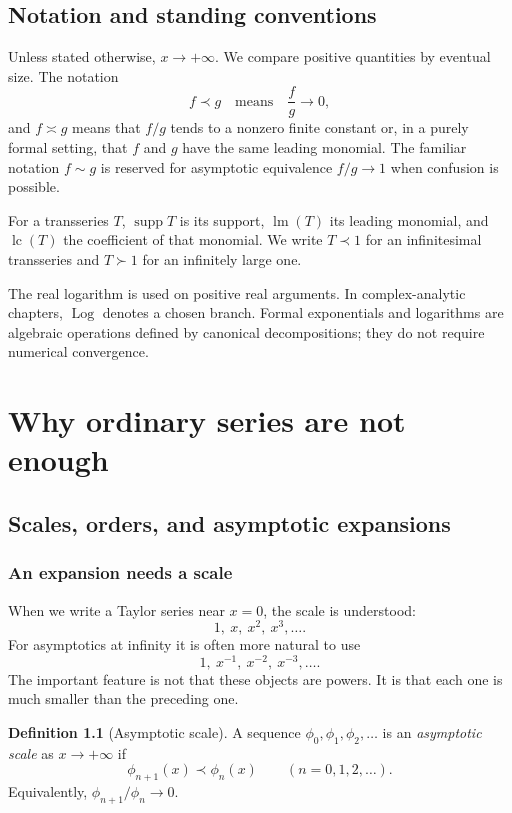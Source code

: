 \documentclass[11pt,openany]{book}
\theoremstyle{definition}
\newtheorem{definition}{Definition}[chapter]
\theoremstyle{plain}
\theoremstyle{remark}
\newcommand{\asym}{\sim}
\newcommand{\precdom}{\prec}
\newcommand{\succdom}{\succ}
\newcommand{\equivdom}{\asymp}
\DeclareMathOperator{\supp}{supp}
\DeclareMathOperator{\lm}{lm}
\DeclareMathOperator{\lc}{lc}
\DeclareMathOperator{\Log}{Log}
\begin{document}
\chapter*{Notation and standing conventions}

Unless stated otherwise, $x\to+\infty$. We compare positive quantities by eventual size. The notation
\[
 f\precdom g
 \quad\text{means}\quad
 \frac{f}{g}\longrightarrow 0,
\]
and $f\equivdom g$ means that $f/g$ tends to a nonzero finite constant or, in a purely formal setting, that $f$ and $g$ have the same leading monomial. The familiar notation $f\asym g$ is reserved for asymptotic equivalence $f/g\to1$ when confusion is possible.

For a transseries $T$, $\supp T$ is its support, $\lm(T)$ its leading monomial, and $\lc(T)$ the coefficient of that monomial. We write $T\precdom1$ for an infinitesimal transseries and $T\succdom1$ for an infinitely large one.

The real logarithm is used on positive real arguments. In complex-analytic chapters, $\Log$ denotes a chosen branch. Formal exponentials and logarithms are algebraic operations defined by canonical decompositions; they do not require numerical convergence.

\tableofcontents

\mainmatter

\part{Why ordinary series are not enough}

\chapter{Scales, orders, and asymptotic expansions}\label{ch:scales}

\section{An expansion needs a scale}

When we write a Taylor series near $x=0$, the scale is understood:
\[
 1,\ x,\ x^2,\ x^3,\ldots.
\]
For asymptotics at infinity it is often more natural to use
\[
 1,\ x^{-1},\ x^{-2},\ x^{-3},\ldots.
\]
The important feature is not that these objects are powers. It is that each one is much smaller than the preceding one.

\begin{definition}[Asymptotic scale]
A sequence $\phi_0,\phi_1,\phi_2,\ldots$ is an \emph{asymptotic scale} as $x\to+\infty$ if
\[
 \phi_{n+1}(x)\precdom \phi_n(x)
 \qquad(n=0,1,2,\ldots).
\]
Equivalently, $\phi_{n+1}/\phi_n\to0$.
\end{definition}
\end{document}
